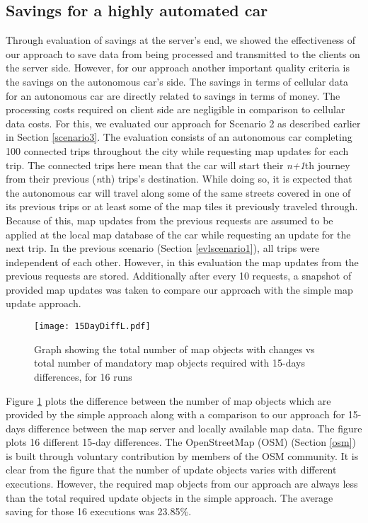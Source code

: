 \subsection{Savings for a highly automated car}
Through evaluation of savings at the server's end, we showed the effectiveness of our approach to save data from being processed and transmitted to the clients on the server side. However, for our approach another important quality criteria is the savings on the autonomous car's side. The savings in terms of cellular data for an autonomous car are directly related to savings in terms of money. The processing costs required on client side are negligible in comparison to cellular data costs. For this, we evaluated our approach for Scenario 2 as described earlier in Section \ref{scenario3}. The evaluation consists of an autonomous car completing 100 connected trips throughout the city while requesting map updates for each trip. The connected trips here mean that the car will start their \textit{n+1}th journey from their previous (\textit{n}th) trips's destination. While doing so, it is expected that the autonomous car will travel along some of the same streets covered in one of its previous trips or at least some of the map tiles it previously traveled through. Because of this, map updates from the previous requests are assumed to be applied at the local map database of the car while requesting an update for the next trip. In the previous scenario (Section \ref{evlscenario1}), all trips were independent of each other. However, in this evaluation the map updates from the previous requests are stored. Additionally after every 10 requests, a snapshot of provided map updates was taken to compare our approach with the simple map update approach. \\

\begin{figure}
\centering
\texttt{[image: 15DayDiffL.pdf]}
\caption{Graph showing the total number of map objects with changes vs total number of mandatory map objects required with 15-days differences, for 16 runs}
\label{fg:16x15d}
\end{figure}

Figure \ref{fg:16x15d} plots the difference between the number of map objects which are provided by the simple approach along with a comparison to our approach for 15-days difference between the map server and locally available map data. The figure plots 16 different 15-day differences. The OpenStreetMap (OSM) (Section \ref{osm}) is built through voluntary contribution by members of the OSM community. It is clear from the figure that the number of update objects varies with different executions. However, the required map objects from our approach are always less than the total required update objects in the simple approach. The average saving for those 16 executions was 23.85\%. \\

